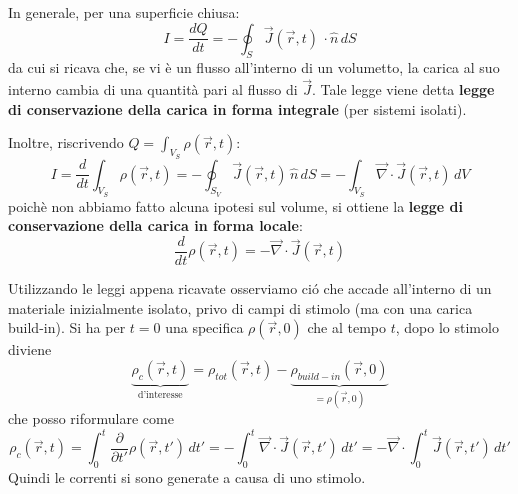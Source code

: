 \documentclass{book}
\begin{document}
\begin{center}
\end{center}
In generale, per una superficie chiusa:
\[
I = \frac{dQ}{dt}=-\oint_S \vec{J}(\vec{r}, t)\, \cdot \hat{n}\,dS
\]
da cui si ricava che, se vi \`e un flusso all'interno di un volumetto, la carica al suo interno cambia di una quantit\`a pari al flusso di $\vec{J}$.
Tale legge viene detta \textbf{legge di conservazione della carica in forma integrale} (per sistemi isolati).

Inoltre, riscrivendo $Q=\int_{V_S}\rho(\vec{r},t)$:
\[
\displaystyle I = \frac{d}{dt}\int_{V_S}\rho(\vec{r},t)=-\oint_{S_V}\vec{J}(\vec{r},t)\,\hat{n}\,dS=-\int_{V_{S}} \vec{\nabla} \cdot \vec{J}(\vec{r},t) \, dV
\]
poich\`e non abbiamo fatto alcuna ipotesi sul volume, si ottiene la \textbf{legge di conservazione della carica in forma locale}:
\[
\boxed{
\frac{d}{dt}\rho(\vec{r},t)=-\vec{\nabla} \cdot \vec{J}(\vec{r},t)}
\]

Utilizzando le leggi appena ricavate osserviamo ci\'o che accade all'interno di un materiale inizialmente isolato, privo di campi di stimolo
(ma con una carica build-in). Si ha per $t=0$ una specifica $\rho(\vec{r},0)$ che al tempo $t$, dopo lo stimolo diviene
\[
 \underbrace{\rho_{c}(\vec{r},t)}_{\text{d'interesse}}= \rho_{tot}(\vec{r},t)- \underbrace{\rho_{build-in}(\vec{r},0)}_{=\rho(\vec{r},0)}
\]
che posso riformulare come 
\[
\rho_{c}(\vec{r},t)=\int_{0}^{t}\frac{\partial}{\partial{t'}}\rho(\vec{r},t')\,dt'=-\int_{0}^{t}\vec{\nabla} \cdot \vec{J}(\vec{r},t')\,dt'=-\vec{\nabla} \cdot \int_{0}^{t}\vec{J}(\vec{r},t')\,dt'
\]
Quindi le correnti si sono generate a causa di uno stimolo.
\end{document}
